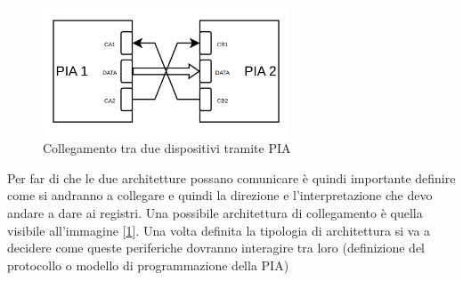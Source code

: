 \begin{figure}
    \centering
    \includegraphics[width=0.65\textwidth]{img/PIA-CON.png}
    \caption{Collegamento tra due dispositivi tramite PIA}\label{img:PIA-CON}
\end{figure}
Per far di che le due architetture possano comunicare è quindi importante definire come si andranno a collegare e quindi la direzione e l'interpretazione che devo andare a dare ai registri. Una possibile architettura di collegamento è quella visibile all'immagine [\ref{img:PIA-CON}].
Una volta definita la tipologia di architettura si va a decidere come queste periferiche dovranno interagire tra loro (definizione del protocollo o modello di programmazione della PIA)